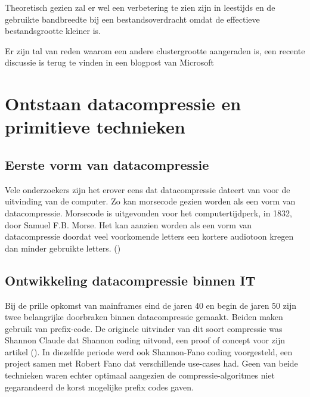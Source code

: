 Theoretisch gezien zal er wel een verbetering te zien zijn in \glspl{leestijd} en de gebruikte \gls{bandbreedte} bij een bestandsoverdracht omdat de effectieve bestandsgrootte kleiner is. 

Er zijn tal van reden waarom een andere \gls{clustergrootte} aangeraden is, een recente discussie is terug te vinden in een blogpost van Microsoft

\section{Ontstaan datacompressie en primitieve technieken}
\label{sec:ontstaan-datacompressie-primitieve-technieken}
\subsection{Eerste vorm van datacompressie}
\label{sec:ontstaan-datacompressie-primitieve-technieken-eerste-vorm}
Vele onderzoekers zijn het erover eens dat \gls{datacompressie} dateert van voor de uitvinding van de computer. Zo kan morsecode gezien worden als een vorm van \gls{datacompressie}. Morsecode is uitgevonden voor het computertijdperk, in 1832, door Samuel F.B. Morse. Het kan aanzien worden als een vorm van datacompressie doordat veel voorkomende letters een kortere audiotoon kregen dan minder gebruikte letters. (\cite{morsecode})

\subsection{Ontwikkeling datacompressie binnen IT}
\label{sec:ontstaan-datacompressie-primitieve-technieken-binnen-it}

Bij de prille opkomst van mainframes eind de jaren 40 en begin de jaren 50 zijn twee belangrijke doorbraken binnen \gls{datacompressie} gemaakt. Beiden maken gebruik van \gls{prefix-code}. De originele uitvinder van dit soort compressie was Shannon Claude dat Shannon coding uitvond, een proof of concept voor zijn artikel  (\cite{shannon1948}). In diezelfde periode werd ook Shannon-Fano coding voorgesteld, een project samen met Robert Fano dat verschillende \glspl{use-case} had. Geen van beide technieken waren echter optimaal aangezien de \glspl{compressie-algoritme} niet gegarandeerd de korst mogelijke prefix codes gaven. 

